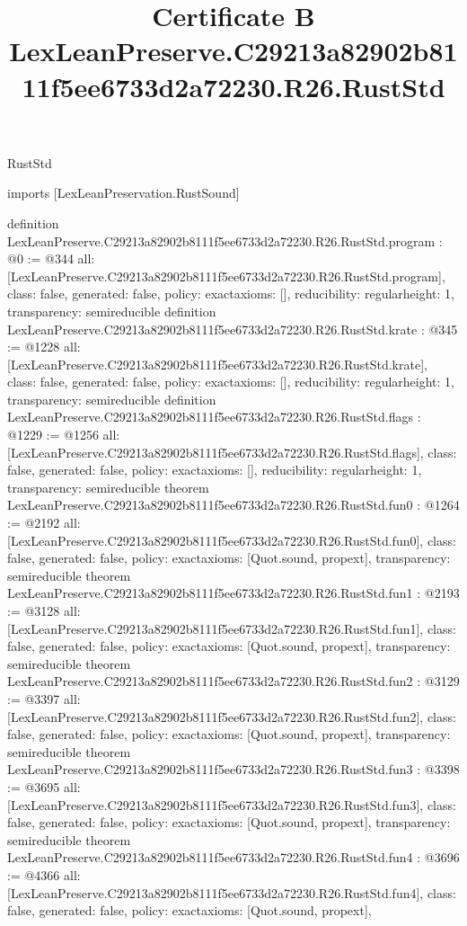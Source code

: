 \begin{lexlean}{RustStd}
\title{Certificate B LexLeanPreserve.C29213a82902b8111f5ee6733d2a72230.R26.RustStd}
\begin{coremodule}
imports [LexLeanPreservation.RustSound]

definition LexLeanPreserve.C29213a82902b8111f5ee6733d2a72230.R26.RustStd.program : @0 := @344 {
  all: [LexLeanPreserve.C29213a82902b8111f5ee6733d2a72230.R26.RustStd.program],
  class: false,
  generated: false,
  policy: exact{axioms: []},
  reducibility: regular{height: 1},
  transparency: semireducible
}
definition LexLeanPreserve.C29213a82902b8111f5ee6733d2a72230.R26.RustStd.krate : @345 := @1228 {
  all: [LexLeanPreserve.C29213a82902b8111f5ee6733d2a72230.R26.RustStd.krate],
  class: false,
  generated: false,
  policy: exact{axioms: []},
  reducibility: regular{height: 1},
  transparency: semireducible
}
definition LexLeanPreserve.C29213a82902b8111f5ee6733d2a72230.R26.RustStd.flags : @1229 := @1256 {
  all: [LexLeanPreserve.C29213a82902b8111f5ee6733d2a72230.R26.RustStd.flags],
  class: false,
  generated: false,
  policy: exact{axioms: []},
  reducibility: regular{height: 1},
  transparency: semireducible
}
theorem LexLeanPreserve.C29213a82902b8111f5ee6733d2a72230.R26.RustStd.fun0 : @1264 := @2192 {
  all: [LexLeanPreserve.C29213a82902b8111f5ee6733d2a72230.R26.RustStd.fun0],
  class: false,
  generated: false,
  policy: exact{axioms: [Quot.sound, propext]},
  transparency: semireducible
}
theorem LexLeanPreserve.C29213a82902b8111f5ee6733d2a72230.R26.RustStd.fun1 : @2193 := @3128 {
  all: [LexLeanPreserve.C29213a82902b8111f5ee6733d2a72230.R26.RustStd.fun1],
  class: false,
  generated: false,
  policy: exact{axioms: [Quot.sound, propext]},
  transparency: semireducible
}
theorem LexLeanPreserve.C29213a82902b8111f5ee6733d2a72230.R26.RustStd.fun2 : @3129 := @3397 {
  all: [LexLeanPreserve.C29213a82902b8111f5ee6733d2a72230.R26.RustStd.fun2],
  class: false,
  generated: false,
  policy: exact{axioms: [Quot.sound, propext]},
  transparency: semireducible
}
theorem LexLeanPreserve.C29213a82902b8111f5ee6733d2a72230.R26.RustStd.fun3 : @3398 := @3695 {
  all: [LexLeanPreserve.C29213a82902b8111f5ee6733d2a72230.R26.RustStd.fun3],
  class: false,
  generated: false,
  policy: exact{axioms: [Quot.sound, propext]},
  transparency: semireducible
}
theorem LexLeanPreserve.C29213a82902b8111f5ee6733d2a72230.R26.RustStd.fun4 : @3696 := @4366 {
  all: [LexLeanPreserve.C29213a82902b8111f5ee6733d2a72230.R26.RustStd.fun4],
  class: false,
  generated: false,
  policy: exact{axioms: [Quot.sound, propext]},
}
\end{coremodule}
\end{lexlean}
